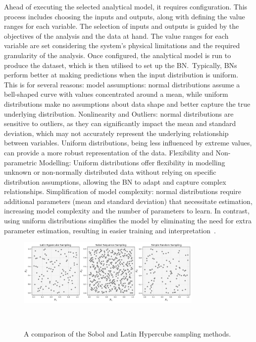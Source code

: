 \documentclass[journal]{IEEEtran}
\begin{document}
Ahead of executing the selected analytical model, it requires configuration. This process includes choosing the inputs and outputs, along with defining the value ranges for each variable. The selection of inputs and outputs is guided by the objectives of the analysis and the data at hand. The value ranges for each variable are set considering the system's physical limitations and the required granularity of the analysis. Once configured, the analytical model is run to produce the dataset, which is then utilised to set up the BN.~Typically, BNs perform better at making predictions when the input distribution is uniform. This is for several reasons: model assumptions: normal distributions assume a bell-shaped curve with values concentrated around a mean, while uniform distributions make no assumptions about data shape and better capture the true underlying distribution. Nonlinearity and Outliers: normal distributions are sensitive to outliers, as they can significantly impact the mean and standard deviation, which may not accurately represent the underlying relationship between variables. Uniform distributions, being less influenced by extreme values, can provide a more robust representation of the data. Flexibility and Non-parametric Modelling: Uniform distributions offer flexibility in modelling unknown or non-normally distributed data without relying on specific distribution assumptions, allowing the BN to adapt and capture complex relationships. Simplification of model complexity: normal distributions require additional parameters (mean and standard deviation) that necessitate estimation, increasing model complexity and the number of parameters to learn. In contrast, using uniform distributions simplifies the model by eliminating the need for extra parameter estimation, resulting in easier training and interpretation~\cite{Duda1973,Neapolitan2004, Koller2009}.

\begin{figure}[t]
    \centering
    \includegraphics[width=0.8\textwidth]{figures/methodology/sobol_vs_lhs_simple.png}
    \caption{\small A comparison of the Sobol and Latin Hypercube sampling methods.}~\label{fig:sobol_vs_lhs}
\end{figure}
\end{document}
